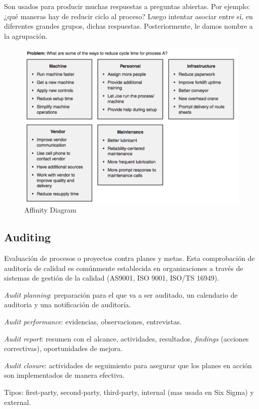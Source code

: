 \documentclass[]{article}
\begin{document}
Son usados para producir muchas respuestas a preguntas abiertas. Por ejemplo:¿qué maneras hay de reducir ciclo al proceso? Luego intentar asociar entre sí, en diferentes grandes grupos, dichas respuestas. Posteriormente, le damos nombre a la agrupación.

\begin{figure}[H]
	\centering
	\includegraphics[width=120mm]{imagenes/AffinityDiagram.png}
	\caption{Affinity Diagram}
	\label{fig:AffinityDiagram}
\end{figure}

\subsection{Auditing}

Evaluación de procesos o proyectos contra planes y metas. Esta comprobación de auditoría de calidad es comúnmente establecida en organizaciones a través de sistemas de gestión de la calidad (AS9001, ISO 9001, ISO/TS 16949).

\textit{Audit planning}: preparación para el que va a ser auditado, un calendario de auditoria y una notificación de auditoría.

\textit{Audit performance}: evidencias, observaciones, entrevistas.

\textit{Audit report}: resumen con el alcance, actividades, resultados, \textit{findings} (acciones correctivas), oportunidades de mejora.

\textit{Audit closure}: actividades de seguimiento para asegurar que los planes en acción son implementados de manera efectiva.

Tipos: first-party, second-party, third-party, internal (mas usada en Six Sigma) y external.
\end{document}
